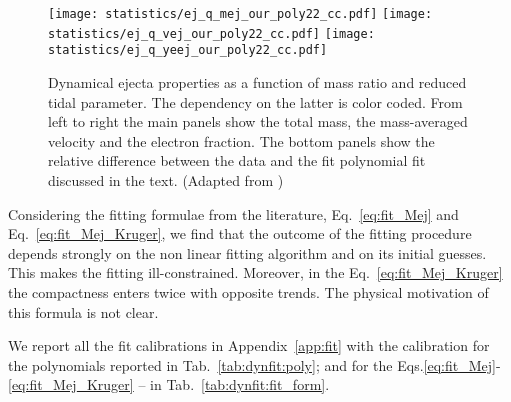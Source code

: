 \begin{figure*}[t]
    \centering 
    \texttt{[image: statistics/ej\_q\_mej\_our\_poly22\_cc.pdf]}
    \texttt{[image: statistics/ej\_q\_vej\_our\_poly22\_cc.pdf]}
    \texttt{[image: statistics/ej\_q\_yeej\_our\_poly22\_cc.pdf]}
    \caption{Dynamical ejecta properties as a function of mass ratio
        and reduced tidal parameter. The dependency on the latter is
        color coded. From left to right the main panels show the total
        mass, the mass-averaged velocity and the electron fraction.
        The bottom panels show the relative difference between the data
        and the fit polynomial fit discussed in the text.
        (Adapted from \citet{Nedora:2020pak})
    }
    \label{fig:ejecta:dyn:dsfits}
\end{figure*}

Considering the fitting formulae from the literature, Eq.~\eqref{eq:fit_Mej} and Eq.~\eqref{eq:fit_Mej_Kruger},
we find that the outcome of the fitting procedure depends strongly on the non linear fitting algorithm 
and on its initial guesses. This makes the fitting ill-constrained.
Moreover, in the Eq.~\eqref{eq:fit_Mej_Kruger} the compactness enters twice with opposite trends. 
The physical motivation of this formula is not clear.

We report all the fit calibrations in Appendix~\ref{app:fit}
with the calibration for the polynomials reported in Tab.~\ref{tab:dynfit:poly};
and for the Eqs.\eqref{eq:fit_Mej}-\eqref{eq:fit_Mej_Kruger} -- in Tab.~\ref{tab:dynfit:fit_form}.

 

